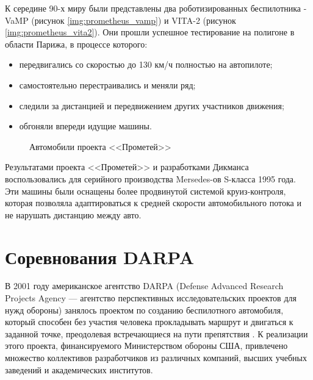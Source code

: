 К середине 90-х миру были представлены два роботизированных беспилотника - 
VaMP (рисунок \ref{img:prometheus_vamp}) и VITA-2
(рисунок \ref{img:prometheus_vita2}). Они прошли успешное тестирование на 
полигоне в области Парижа, в процессе которого:

\begin{itemize}
  \item передвигались со скоростью до 130 км/ч полностью на автопилоте;
  \item самостоятельно перестраивались и меняли ряд;
  \item следили за дистанцией и передвижением других участников движения;
  \item обгоняли впереди идущие машины.
\end{itemize}

\begin{figure}[ht]
  {\centering
      \hfill
      \hfill
      \hfill
  }
  \caption{Автомобили проекта <<Прометей>>}
  \label{img:prometheus}
\end{figure}

Результатами проекта <<Прометей>> и разработками Дикманса воспользовались для 
серийного производства Mersedes-ов S-класса 1995 года. Эти машины были 
оснащены более продвинутой системой круиз-контроля, которая позволяла 
адаптироваться к средней скорости автомобильного потока и не нарушать дистанцию 
между авто.





\section{Соревнования DARPA} \label{sect_DARPA}

В 2001 году американское агентство DARPA (Defense Advanced Research Projects 
Agency — агентство перспективных исследовательских проектов для нужд обороны) 
занялось проектом по созданию беспилотного автомобиля, который способен без 
участия человека прокладывать маршрут и двигаться к заданной точке, 
преодолевая встречающиеся на пути препятствия \cite{DARPAchallnge}.
К реализации этого проекта, 
финансируемого Министерством обороны США, привлечено множество коллективов 
разработчиков из различных компаний, высших учебных заведений и академических 
институтов.

